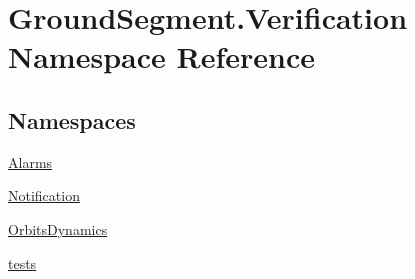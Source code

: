 \hypertarget{namespace_ground_segment_1_1_verification}{}\section{Ground\+Segment.\+Verification Namespace Reference}
\label{namespace_ground_segment_1_1_verification}
\subsection*{Namespaces}
\begin{DoxyCompactItemize}
\item 
 \hyperlink{namespace_ground_segment_1_1_verification_1_1_alarms}{Alarms}
\item 
 \hyperlink{namespace_ground_segment_1_1_verification_1_1_notification}{Notification}
\item 
 \hyperlink{namespace_ground_segment_1_1_verification_1_1_orbits_dynamics}{Orbits\+Dynamics}
\item 
 \hyperlink{namespace_ground_segment_1_1_verification_1_1tests}{tests}
\end{DoxyCompactItemize}
